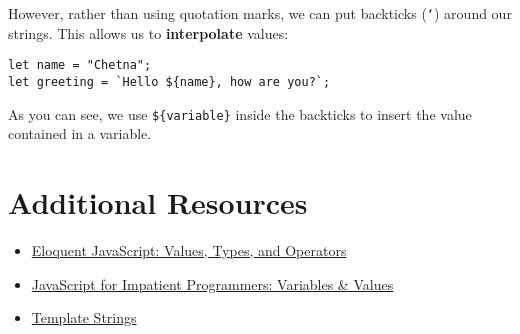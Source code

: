 However, rather than using quotation marks, we can put backticks (\texttt{`}) around our strings. This allows us to \textbf{interpolate} values:

\begin{verbatim}
let name = "Chetna";
let greeting = `Hello ${name}, how are you?`;
\end{verbatim}

As you can see, we use \texttt{\$\{variable\}} inside the backticks to insert the value contained in a variable.

\section{Additional Resources}

\begin{itemize}[leftmargin=*]
    \item \href{https://eloquentjavascript.net/01_values.html}{Eloquent JavaScript: Values, Types, and Operators}
    \item \href{http://exploringjs.com/impatient-js/ch_variables-assignment.html}{JavaScript for Impatient Programmers: Variables \& Values}
    \item \href{https://developers.google.com/web/updates/2015/01/ES6-Template-Strings#string_substitution}{Template Strings}
\end{itemize}
